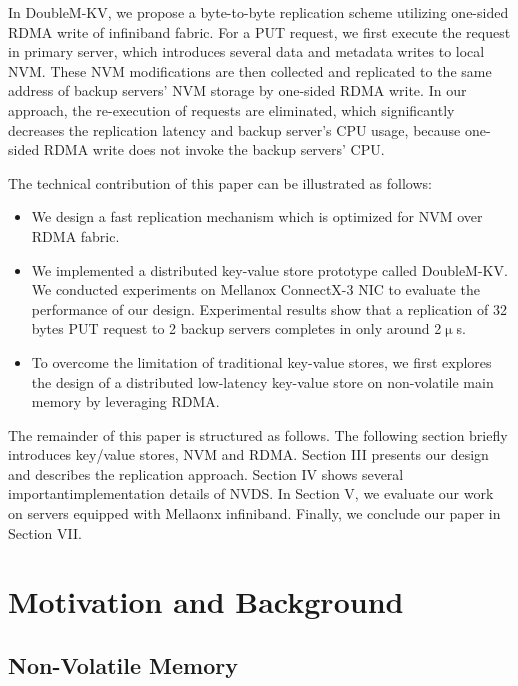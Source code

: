 \documentclass[format=acmsmall, review=false, screen=true]{acmart}
\begin{document}
	\par In DoubleM-KV, we propose a byte-to-byte replication scheme utilizing one-sided RDMA write of infiniband fabric. For a PUT	request, we first execute the request in primary server, which introduces several data and metadata writes to local NVM. These NVM modifications are then collected and replicated to the same address of backup servers' NVM storage by one-sided RDMA write. In our approach, the re-execution of requests are eliminated, which significantly decreases the replication latency and backup server's CPU usage, because one-sided RDMA write does not invoke the backup servers' CPU. 
		
	\noindent The technical contribution of this paper can be illustrated as follows:

	\begin{itemize}
		\item We design a fast replication mechanism which is optimized for NVM over RDMA fabric.
		\item We implemented a distributed key-value store prototype called DoubleM-KV. We conducted experiments on Mellanox ConnectX-3 NIC to evaluate the performance of our design. Experimental results show that a replication of 32 bytes PUT request to 2 backup servers completes in only around 2$\upmu$s.
		\item To overcome the limitation of traditional key-value stores, we first explores the design of a distributed low-latency key-value store on non-volatile main memory by leveraging RDMA. 
	\end{itemize}

	The remainder of this paper is structured as follows. The following section briefly introduces key/value stores, NVM and RDMA. Section III presents our design and describes the replication approach. Section IV shows several importantimplementation details of NVDS. In Section V, we evaluate our work on servers equipped with Mellaonx infiniband. Finally, we conclude our paper in Section VII.

	
	

	

	

	
	
	
	
\section{Motivation and Background}

\subsection{Non-Volatile Memory}	
	
\end{document}
